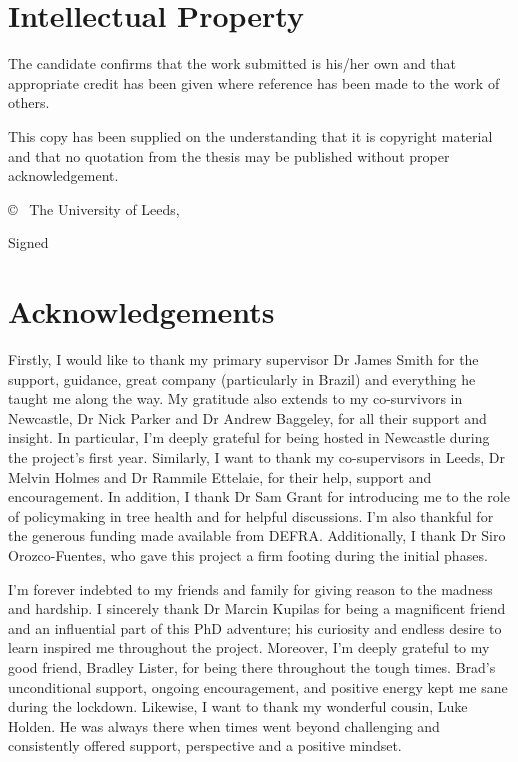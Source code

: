 \chapter*{Intellectual Property}
The candidate confirms that the work submitted is his/her own and that appropriate credit has been given where reference has been made to the work of others.

This copy has been supplied on the understanding that it is copyright material and that no quotation from the thesis may be published without proper acknowledgement.

© \submissionyear\ The University of Leeds, \name

\vspace{2cm}
Signed 

\chapter*{Acknowledgements}
Firstly, I would like to thank my primary supervisor Dr James Smith for the support, guidance, great company (particularly in Brazil) and everything he taught me along the way. 
My gratitude also extends to my co-survivors in Newcastle, Dr Nick Parker and Dr Andrew Baggeley, for all their support and insight. In particular, I'm deeply grateful for being hosted in Newcastle during the project's first year. Similarly, I want to thank my co-supervisors in Leeds, Dr Melvin Holmes and Dr Rammile Ettelaie, for their help, support and encouragement. In addition, I thank Dr Sam Grant for introducing me to the role of policymaking in tree health and for helpful discussions. I'm also thankful for the generous funding made available from DEFRA. 
Additionally, I thank Dr Siro Orozco-Fuentes, who gave this project a firm footing during the initial phases.

I'm forever indebted to my friends and family for giving reason to the madness and hardship. I sincerely thank Dr Marcin Kupilas for being a magnificent friend and an influential part of this PhD adventure; his curiosity and endless desire to learn inspired me throughout the project. Moreover, I'm deeply grateful to my good friend, Bradley Lister, for being there throughout the tough times. Brad's unconditional support, ongoing encouragement, and positive energy kept me sane during the lockdown. Likewise, I want to thank my wonderful cousin, Luke Holden. He was always there when times went beyond challenging and consistently offered support, perspective and a positive mindset.

